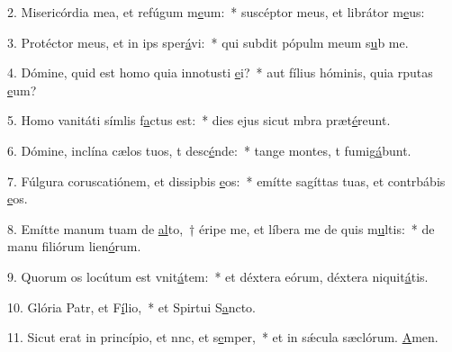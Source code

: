 2. Misericórdia mea, et refúgum m\uline{e}um:~* suscéptor meus, et librátor m\uline{e}us:\par 
3. Protéctor meus, et in ips sper\uline{á}vi:~* qui subdit pópulm meum s\uline{u}b me.\par 
4. Dómine, quid est homo quia innotusti \uline{e}i?~* aut fílius hóminis, quia rputas \uline{e}um?\par 
5. Homo vanitáti símlis f\uline{a}ctus est:~* dies ejus sicut mbra præt\uline{é}reunt.\par 
6. Dómine, inclína cælos tuos, t desc\uline{é}nde:~* tange montes, t fumig\uline{á}bunt.\par 
7. Fúlgura coruscatiónem, et dissipbis \uline{e}os:~* emítte sagíttas tuas, et contrbábis \uline{e}os.\par 
8. Emítte manum tuam de \uline{al}to,~† éripe me, et líbera me de quis m\uline{u}ltis:~* de manu filiórum lien\uline{ó}rum.\par 
9. Quorum os locútum est vnit\uline{á}tem:~* et déxtera eórum, déxtera niquit\uline{á}tis.\par 
10. Glória Patr, et F\uline{í}lio,~* et Spirtui S\uline{a}ncto.\par 
11. Sicut erat in princípio, et nnc, et s\uline{e}mper,~* et in sǽcula sæclórum. \uline{A}men.\par 
